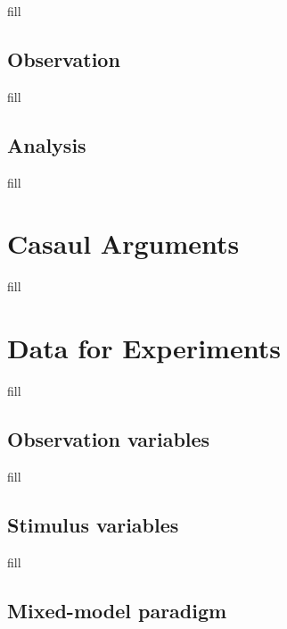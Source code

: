 \documentclass[
  b5paper]{book}
\begin{document}
fill

\hypertarget{observation}{%
\subsection*{Observation}\label{observation}}

fill

\hypertarget{analysis}{%
\subsection*{Analysis}\label{analysis}}

fill

\hypertarget{casaul-arguments}{%
\section{Casaul Arguments}\label{casaul-arguments}}

fill

\hypertarget{data-for-experiments}{%
\section{Data for Experiments}\label{data-for-experiments}}

fill

\hypertarget{observation-variables}{%
\subsection*{Observation variables}\label{observation-variables}}

fill

\hypertarget{stimulus-variables}{%
\subsection*{Stimulus variables}\label{stimulus-variables}}

fill

\hypertarget{mixed-model-paradigm}{%
\subsection*{Mixed-model paradigm}\label{mixed-model-paradigm}}
\end{document}
